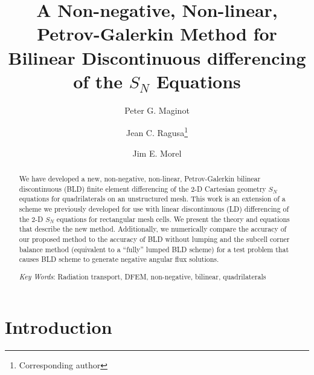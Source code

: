 \documentclass{mc2015}
\begin{document}
\title{A Non-negative, Non-linear, Petrov-Galerkin Method for Bilinear Discontinuous differencing of the $S_N$ Equations}

\author{Peter G. Maginot}
\author{Jean C. Ragusa\footnote{Corresponding author} }
\author{Jim E. Morel}

\maketitle

\begin{abstract}
We have developed a new, non-negative, non-linear, Petrov-Galerkin bilinear discontinuous  
(BLD) finite element differencing of the 2-D Cartesian geometry $S_N$ equations for quadrilaterals on an unstructured mesh.  
This work is an extension of a scheme we previously developed for use with linear discontinuous (LD) differencing of the 2-D $S_N$ equations for rectangular mesh cells.
We present the theory and equations that describe the new method.  
Additionally, we numerically compare the accuracy of our proposed method to the accuracy of BLD without lumping and the subcell corner balance method (equivalent to a ``fully'' lumped BLD scheme) for a test problem that causes BLD scheme to generate negative angular flux solutions.

\emph{Key Words}: Radiation transport, DFEM, non-negative, bilinear, quadrilaterals
\end{abstract}


\section{Introduction}

%
%
%
\end{document}
